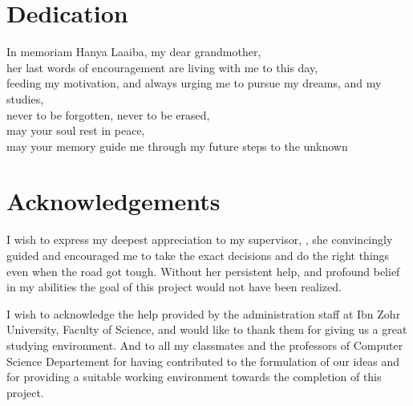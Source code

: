

\chapter*{Dedication}
%
\vspace*{\fill}

\begin{center}
  In memoriam Hanya Laaiba, my dear grandmother, ~ \\
  her last words of encouragement are living with me to this day, ~ \\
  feeding my motivation, and always urging me to pursue my dreams, and my studies, ~\\
  never to be forgotten, never to be erased, ~ \\
  may your soul rest in peace, ~ \\
  may your memory guide me through my future steps to the unknown ~ \\


\end{center}
%
\vspace*{\fill}

%
%
%
%
%
%
\cleardoublepage%
\chapter*{Acknowledgements}
%

I wish to express my deepest appreciation to my supervisor, \mentor, she convincingly guided and encouraged me to take the exact decisions and do the right things even when the road got tough. Without her persistent help, and profound belief in my abilities the goal of this project would not have been realized.

I wish to acknowledge the help provided by the administration staff at Ibn Zohr University, Faculty of Science, and would like to thank them for giving us a great studying environment. And to all my classmates and the professors of Computer Science Departement for having contributed to the formulation of our ideas and for providing a suitable working environment towards the completion of this project.

